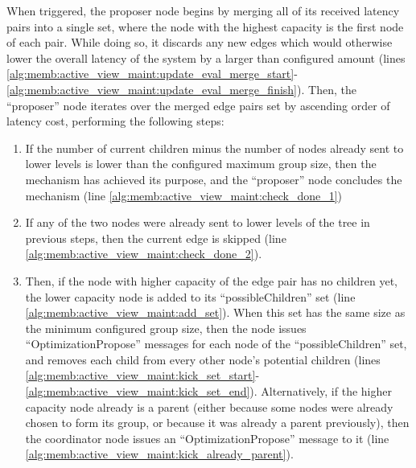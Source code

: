 When triggered, the proposer node begins by merging all of its received latency pairs into a single set, where the node with the highest capacity is the first node of each pair. While doing so, it discards any new edges which would otherwise lower the overall latency of the system by a larger than configured amount (lines \ref{alg:memb:active_view_maint:update_eval_merge_start}-\ref{alg:memb:active_view_maint:update_eval_merge_finish}). Then, the ``proposer'' node iterates over the merged edge pairs set by ascending order of latency cost, performing the following steps:

\begin{enumerate}
    \item If the number of current children minus the number of nodes already sent to lower levels is lower than the configured maximum group size, then the mechanism has achieved its purpose, and the ``proposer'' node concludes the mechanism (line \ref{alg:memb:active_view_maint:check_done_1})
    
    \item If any of the two nodes were already sent to lower levels of the tree in previous steps, then the current edge is skipped (line \ref{alg:memb:active_view_maint:check_done_2}).
    
    \item Then, if the node with higher capacity of the edge pair has no children yet, the lower capacity node is added to its ``possibleChildren'' set (line \ref{alg:memb:active_view_maint:add_set}). When this set has the same size as the minimum configured group size, then the node issues ``OptimizationPropose'' messages for each node of the ``possibleChildren'' set, and removes each child from every other node's potential children (lines \ref{alg:memb:active_view_maint:kick_set_start}-\ref{alg:memb:active_view_maint:kick_set_end}). Alternatively, if the higher capacity node already is a parent (either because some nodes were already chosen to form its group, or because it was already a parent previously), then the coordinator node issues an ``OptimizationPropose'' message to it (line \ref{alg:memb:active_view_maint:kick_already_parent}).
\end{enumerate}

